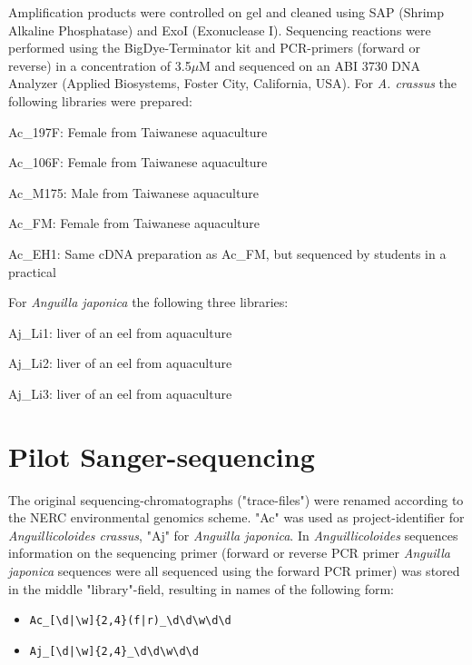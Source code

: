 Amplification products were controlled on gel and cleaned using SAP
(Shrimp Alkaline Phosphatase) and ExoI (Exonuclease I). Sequencing
reactions were performed using the BigDye-Terminator kit and
PCR-primers (forward or reverse) in a concentration of 3.5$\mu$M and
sequenced on an ABI 3730 DNA Analyzer (Applied Biosystems, Foster
City, California, USA).  For \textit{A. crassus} the following
libraries were prepared:
 
\begin{description}
\item{Ac\_197F:} Female from Taiwanese aquaculture
\item{Ac\_106F:} Female from Taiwanese aquaculture
\item{Ac\_M175:} Male from Taiwanese aquaculture
\item{Ac\_FM:} Female from Taiwanese aquaculture
\item{Ac\_EH1:} Same cDNA preparation as Ac\_FM, but sequenced by
  students in a practical
\end{description}

For \textit{Anguilla japonica} the following three libraries:
\begin{description}
\item{Aj\_Li1:} liver of an eel from aquaculture
\item{Aj\_Li2:} liver of an eel from aquaculture
\item{Aj\_Li3:} liver of an eel from aquaculture
\end{description}

\section{Pilot Sanger-sequencing}

The original sequencing-chromatographs ("trace-files") were renamed
according to the NERC environmental genomics scheme. "Ac" was used as
project-identifier for \textit{Anguillicoloides crassus}, "Aj" for
\textit{Anguilla japonica}. In \textit{Anguillicoloides} sequences
information on the sequencing primer (forward or reverse PCR primer
\textit{Anguilla japonica} sequences were all sequenced using the
forward PCR primer) was stored in the middle
"library"-field, resulting in names of the following form:

\begin{itemize}
\item \texttt{Ac\_[\textbackslash{}d|\textbackslash{}w]\{2,4\}(f|r)\_\textbackslash{}d\textbackslash{}d\textbackslash{}w\textbackslash{}d\textbackslash{}d}
\item  \texttt{Aj\_[\textbackslash{}d|\textbackslash{}w]\{2,4\}\_\textbackslash{}d\textbackslash{}d\textbackslash{}w\textbackslash{}d\textbackslash{}d}
\end{itemize}

